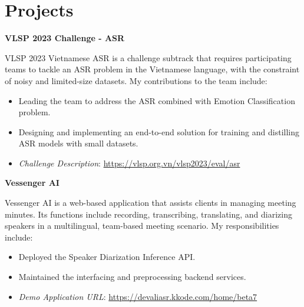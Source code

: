 \section{Projects}
\vspace{-2mm}
\begin{multicols}{1}
    \begin{flushleft}
        \textbf{VLSP 2023 Challenge - ASR}
    \end{flushleft}
\end{multicols}

\vspace{-5mm}

\indent VLSP 2023 Vietnamese ASR is a challenge subtrack that requires participating teams to tackle an ASR problem in the Vietnamese language, with the constraint of noisy and limited-size datasets. My contributions to the team include:
\vspace{-1.5mm}
\begin{itemize}[noitemsep]
    \item Leading the team to address the ASR combined with Emotion Classification problem.
    \item Designing and implementing an end-to-end solution for training and distilling ASR models with small datasets.
    \item \emph{Challenge Description}: \href{https://vlsp.org.vn/vlsp2023/eval/asr}{https://vlsp.org.vn/vlsp2023/eval/asr}
\end{itemize}

\begin{multicols}{1}
    \begin{flushleft}
        \textbf{Vessenger AI}
    \end{flushleft}
\end{multicols}

\vspace{-5mm}

\indent Vessenger AI is a web-based application that assists clients in managing meeting minutes. Its functions include recording, transcribing, translating, and diarizing speakers in a multilingual, team-based meeting scenario. My responsibilities include: 
\vspace{-1.5mm}
\begin{itemize}[noitemsep]
    \item Deployed the Speaker Diarization Inference API.
    \item Maintained the interfacing and preprocessing backend services.
    \item \emph{Demo Application URL}: \href{https://devaliasr.kkode.com/home/beta7}{https://devaliasr.kkode.com/home/beta7}
\end{itemize}

